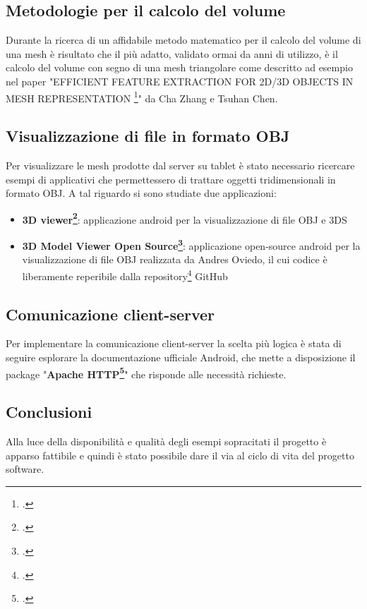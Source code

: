 \newpage
\subsection{Metodologie per il calcolo del volume}
Durante la ricerca di un affidabile metodo matematico per il calcolo del volume di una mesh è risultato che il più adatto, validato ormai da anni di utilizzo, è il calcolo del volume con segno di una mesh triangolare come descritto ad esempio nel paper "EFFICIENT FEATURE EXTRACTION FOR 2D/3D OBJECTS IN MESH REPRESENTATION \footcite{http://research.microsoft.com/en-us/um/people/chazhang/publications/icip01_ChaZhang.pdf}" da Cha Zhang e Tsuhan Chen.

\subsection{Visualizzazione di file in formato OBJ}
Per visualizzare le mesh prodotte dal server su tablet è stato necessario ricercare esempi di applicativi che permettessero di trattare oggetti tridimensionali in formato OBJ. A tal riguardo si sono studiate due applicazioni:
\begin{itemize}
\item\textbf{3D viewer\footcite{https://play.google.com/store/apps/details?id=com.pcvirt.Viewer3D&hl=it}}: 
applicazione android per la visualizzazione di file OBJ e 3DS
\item\textbf{3D Model Viewer Open Source\footcite{https://play.google.com/store/apps/details?id=org.andresoviedo.dddmodel&hl=it}}:
applicazione open-source android per la visualizzazione di file OBJ realizzata da Andres Oviedo, il cui codice è liberamente reperibile dalla repository\footcite{https://github.com/andresoviedo/android-3D-model-viewer} GitHub
\end{itemize}

\subsection{Comunicazione client-server}
Per implementare la comunicazione client-server la scelta più logica è stata di seguire esplorare la documentazione ufficiale Android, che mette a disposizione il package "\textbf{Apache HTTP\footcite{https://developer.android.com/reference/org/apache/http/package-summary.html}}" che risponde alle necessità richieste.

\subsection{Conclusioni}
Alla luce della disponibilità e qualità degli esempi sopracitati il progetto è apparso fattibile e quindi è stato possibile dare il via al ciclo di vita del progetto software.


